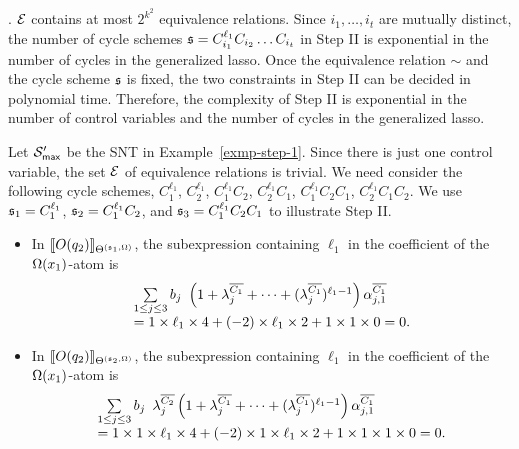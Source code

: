 . ${\mathcal{E} }$ contains at most $2^{k^2}$ equivalence relations. Since $i_1,\dots, i_t$ are mutually distinct, the number of cycle schemes ${\mathfrak{s} } = C_{i_1}^{\ell_1} C_{i_2} \dots C_{i_t}$ in Step II is exponential in the number of cycles in the generalized lasso. Once the equivalence relation $\sim$ and the cycle scheme ${\mathfrak{s} }$ is fixed, the two constraints in Step II can be decided in polynomial time. Therefore, the complexity of Step II is exponential in the number of control variables and the number of cycles in the generalized lasso.



\begin{example}\label{exmp-step-2}
Let ${\mathcal{S} }'_{\sf max}$ be the SNT in Example~\ref{exmp-step-1}. Since there is just one control variable, the set ${\mathcal{E} }$ of equivalence relations is trivial. We need consider the following cycle schemes, $C^{\ell_1}_1$, $C^{\ell_1}_2$, $C^{\ell_1}_1 C_2$, $C^{\ell_1}_2 C_1$, $C^{\ell_1}_1 C_2 C_1$, $C^{\ell_1}_2 C_1 C_2$. We use ${\mathfrak{s} }_1 = C^{\ell_1}_1$, ${\mathfrak{s} }_2 = C^{\ell_1}_1 C_2$, and ${\mathfrak{s} }_3 = C^{\ell_1}_1 C_2 C_1$ to illustrate Step II.
\begin{itemize}
\item In $\llbracket O(q_2)\rrbracket_{\Theta^{({\mathfrak{s} }_1, \Omega)}}$,  the subexpression containing $\ell_1$ in the coefficient of the $\Omega(x_1)$-atom is
\[
\begin{array} {l}
\sum \limits_{1 \le j \le 3} b_j
\begin{array}{l}
\left(1+\lambda^{\overline{C_{1}}}_{j} + \dots + (\lambda^{\overline{C_{1}}}_{j})^{\ell_1-1} \right) \alpha^{\overline{C_{1}}}_{j, 1}
\end{array}
\\
= 1 \times \ell_1 \times 4 +  (-2) \times \ell_1 \times 2 + 1 \times 1 \times 0 = 0.
\end{array}
\]
%
\item In $\llbracket O(q_2)\rrbracket_{\Theta^{({\mathfrak{s} }_2, \Omega)}}$, the subexpression containing $\ell_1$ in the coefficient of the $\Omega(x_1)$-atom is 
\[
\begin{array}{l}
\sum \limits_{1 \le j \le 3} b_j
\begin{array}{l}
 \lambda^{\overline{C_{2}}}_{j}
\left(1+\lambda^{\overline{C_{1}}}_{j} + \dots + (\lambda^{\overline{C_{1}}}_{j})^{\ell_1-1} \right) \alpha^{\overline{C_{1}}}_{j, 1}
\end{array}
\\
= 1 \times 1 \times \ell_1 \times 4 + (-2) \times 1 \times \ell_1 \times 2 + 1 \times 1 \times 1 \times 0 =0.

\end{array}\]
\end{itemize}
\end{example}
